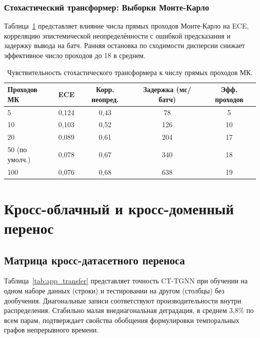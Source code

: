 \subsubsection{Стохастический трансформер: Выборки Монте-Карло}

Таблица~\ref{tab:app_sens_mc} представляет влияние числа прямых проходов Монте-Карло на ECE, корреляцию эпистемической неопределённости с ошибкой предсказания и задержку вывода на батч. Ранняя остановка по сходимости дисперсии снижает эффективное число проходов до 18 в среднем.

\begin{table}[htbp]
\centering
\caption{Чувствительность стохастического трансформера к числу прямых проходов МК.}
\label{tab:app_sens_mc}
\begin{tabular}{lcccc}
\toprule
Проходов МК & ECE & Корр. неопред. & Задержка (мс/батч) & Эфф. проходов \\
\midrule
5   & 0,124 & 0,43 & 78  & 5 \\
10  & 0,103 & 0,52 & 126 & 10 \\
20  & 0,089 & 0,61 & 204 & 17 \\
50 (по умолч.) & 0,078 & 0,67 & 340 & 18 \\
100 & 0,076 & 0,68 & 638 & 19 \\
\bottomrule
\end{tabular}
\end{table}


\section{Кросс-облачный и кросс-доменный перенос}
\label{app:cross_cloud}

\subsection{Матрица кросс-датасетного переноса}
\label{app:transfer_matrix}

Таблица~\ref{tab:app_transfer} представляет точность CT-TGNN при обучении на одном наборе данных (строки) и тестировании на другом (столбцы) без дообучения. Диагональные записи соответствуют производительности внутри распределения. Стабильно малая внедиагональная деградация, в среднем 3,8\% по всем парам, подтверждает свойства обобщения формулировки темпоральных графов непрерывного времени.

